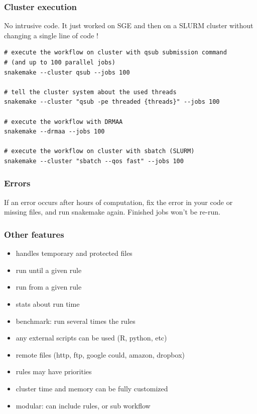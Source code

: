 \documentclass{beamer}
\begin{document}



\begin{frame}[fragile]
\frametitle{Cluster execution}

No intrusive code. It just worked on SGE and then on a SLURM cluster 
without changing a single line of code !

\begin{lstlisting}
# execute the workflow on cluster with qsub submission command
# (and up to 100 parallel jobs)
snakemake --cluster qsub --jobs 100

# tell the cluster system about the used threads
snakemake --cluster "qsub -pe threaded {threads}" --jobs 100

# execute the workflow with DRMAA
snakemake --drmaa --jobs 100

# execute the workflow on cluster with sbatch (SLURM)
snakemake --cluster "sbatch --qos fast" --jobs 100

\end{lstlisting}
\end{frame}


\begin{frame}
 \frametitle{Errors}
 
 If an error occurs after hours of computation, fix the error in your code or missing files, 
 and run snakemake again. Finished jobs won't be re-run. 
 
\end{frame}


\begin{frame}
\frametitle{Other features}

\begin{itemize}
\item handles temporary and protected files
\item run until a given rule
\item run from a given rule
\item stats about run time
\item benchmark: run several times the rules
\item any external scripts can be used (R, python, etc)
\item remote files (http, ftp, google could, amazon, dropbox)
\item rules may have priorities
\item cluster time and memory can be fully customized
\item modular: can include rules, or sub workflow
\end{itemize}

\end{frame}
\end{document}

